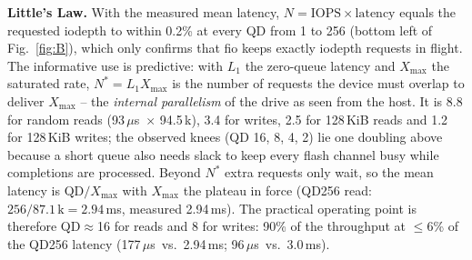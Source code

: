 ﻿\documentclass[10.5pt]{article}
\newcommand{\us}{\,$\mu$s}
\begin{document}
\textbf{Little's Law.} With the measured mean latency, $N=\text{IOPS}\times\text{latency}$ equals the requested iodepth to within 0.2\% at every QD from 1 to 256 (bottom left of Fig.~\ref{fig:B}), which only confirms that fio keeps exactly iodepth requests in flight. The informative use is predictive: with $L_{1}$ the zero-queue latency and $X_{\max}$ the saturated rate, $N^{*}=L_{1}X_{\max}$ is the number of requests the device must overlap to deliver $X_{\max}$ -- the \emph{internal parallelism} of the drive as seen from the host. It is 8.8 for random reads (93\us\ $\times$ 94.5\,k), 3.4 for writes, 2.5 for 128\,KiB reads and 1.2 for 128\,KiB writes; the observed knees (QD 16, 8, 4, 2) lie one doubling above because a short queue also needs slack to keep every flash channel busy while completions are processed. Beyond $N^{*}$ extra requests only wait, so the mean latency is $\text{QD}/X_{\max}$ with $X_{\max}$ the plateau in force (QD256 read: $256/87.1\,\text{k}=2.94$\,ms, measured 2.94\,ms). The practical operating point is therefore QD$\approx$16 for reads and 8 for writes: 90\% of the throughput at $\le$6\% of the QD256 latency (177\us\ vs.\ 2.94\,ms; 96\us\ vs.\ 3.0\,ms).
\end{document}
